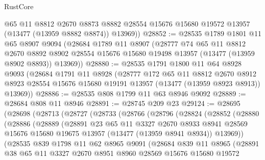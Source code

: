 \begin{lexlean}{RustCore}
\begin{coremodule}
        @65
        @11
        @8812
        @2670
        @8873
        @8882
        @28554
        @15676
        @15680
        @19572
        @13957
        (@13477 (@13959 @8882 @8874))
        @13969))
@28852 := @28535
    @1789
    @1801
    @11
    @65
    @8907
    @9094
    (@28684
      @1789
      @11
      @8907
      (@28777
        @74
        @65
        @11
        @8812
        @2670
        @8892
        @8902
        @28554
        @15676
        @15680
        @19498
        @13957
        (@13477 (@13959 @8902 @8893))
        @13969))
@28880 := @28535
    @1791
    @1800
    @11
    @64
    @8928
    @9093
    (@28684
      @1791
      @11
      @8928
      (@28777
        @172
        @65
        @11
        @8812
        @2670
        @8912
        @8923
        @28554
        @15676
        @15680
        @19191
        @13957
        (@13477 (@13959 @8923 @8913))
        @13969))
@28886 := @28535 @808 @1799 @11 @63 @8946 @9092
@28889 := @28684 @808 @11 @8946
@28891 := @28745 @209 @23
@29124 := @28695
    (@28698
      (@28713
        (@28727
          (@28733
            (@28766
              (@28796
                (@28824
                  (@28852
                    (@28880
                      (@28886
                        (@28889
                          (@28891
                            @23
                            @65
                            @11
                            @3327
                            @2670
                            @8933
                            @8941
                            @28569
                            @15676
                            @15680
                            @19675
                            @13957
                            (@13477 (@13959 @8941 @8934))
                            @13969))
                        (@28535
                          @839
                          @1798
                          @11
                          @62
                          @8965
                          @9091
                          (@28684
                            @839
                            @11
                            @8965
                            (@28891
                              @38
                              @65
                              @11
                              @3327
                              @2670
                              @8951
                              @8960
                              @28569
                              @15676
                              @15680
                              @19572

\end{coremodule}
\end{lexlean}
